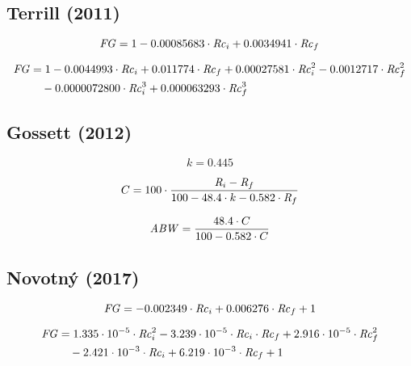 \documentclass[a4paper,parskip=half]{scrartcl}
\begin{document}
\subsection*{Terrill (2011)}

\begin{equation}
\mathit{FG} = 1 - 0.00085683 \cdot \mathit{Rc}_i + 0.0034941 \cdot \mathit{Rc}_f
\label{eq:terrilllinear} 
\end{equation}

\begin{align}
\begin{split}
\mathit{FG} &= 1 - 0.0044993 \cdot \mathit{Rc}_i + 0.011774 \cdot \mathit{Rc}_f + 0.00027581 \cdot \mathit{Rc}_i^2 - 0.0012717 \cdot \mathit{Rc}_f^2 \\
& \quad  - 0.0000072800 \cdot \mathit{Rc}_i^3  + 0.000063293 \cdot \mathit{Rc}_f^3
\end{split} \label{eq:terrillcubic} 
\end{align}

\subsection*{Gossett (2012)}

\begin{equation}
k = 0.445
\end{equation}

\begin{equation}
C = 100 \cdot \frac{\mathit{R}_i - \mathit{R}_f}{100 - 48.4 \cdot k - 0.582 \cdot \mathit{R}_f}
\end{equation}

\begin{equation}
\mathit{ABW} = \frac{48.4 \cdot C}{100 - 0.582 \cdot C}
\label{eq:gossett} 
\end{equation}

\subsection*{Novotný (2017)}

\begin{equation} 
\mathit{FG} = -0.002349 \cdot \mathit{Rc}_i + 0.006276 \cdot \mathit{Rc}_f + 1
\label{eq:novotnylinear} 
\end{equation}

\begin{align}
\begin{split}
\mathit{FG} &= 1.335 \cdot 10^{-5} \cdot \mathit{Rc}_i^2 - 3.239 \cdot 10^{-5} \cdot \mathit{Rc}_i \cdot \mathit{Rc}_f + 2.916 \cdot 10^{-5} \cdot \mathit{Rc}_f^2 \\
& \quad - 2.421 \cdot 10^{-3} \cdot \mathit{Rc}_i + 6.219 \cdot 10^{-3} \cdot \mathit{Rc}_f + 1
\end{split} \label{eq:novotnyquadratic} 
\end{align}
\end{document}
